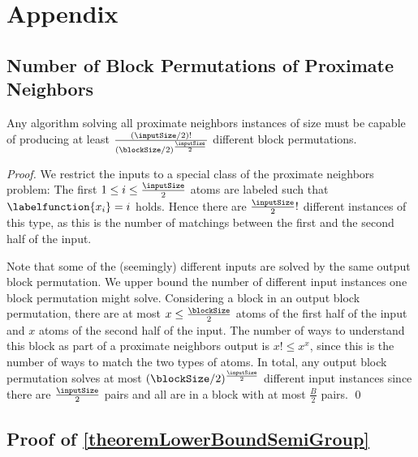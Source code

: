 \documentclass[envcountsame]{llncs}
\begin{document}
\newpage
\appendix

\section{Appendix}

\subsection{Number of Block Permutations of Proximate Neighbors}
\label{appendixProximateNeighbors}

\begin{lemma}
Any algorithm solving all proximate neighbors instances of size  must be capable of producing at least $\frac{(\inputSize/2)!}{(\blockSize/2)^{\frac{\inputSize}{2}}}$ different block permutations.
\end{lemma}

\begin{proof}


We restrict the inputs to a special class of the proximate neighbors problem:
The first $1\leq i\leq\frac{\inputSize}{2}$ atoms are labeled such that $\labelfunction{x_i}=i$ holds.
Hence there are $\frac{\inputSize}{2}!$ different instances of this type, as this is the number of matchings between the first and the second half of the input.

Note that some of the (seemingly) different inputs are solved by the same output block permutation.
We upper bound the number of different input instances one block permutation might solve.
Considering a block in an output block permutation, there are at most $x\leq\frac{\blockSize}{2}$ atoms of the first half of the input and $x$ atoms of the second half of the input.
The number of ways to understand this block as part of a proximate neighbors output is $x! \leq x^x$, since this is the number of ways to match the two types of atoms. In total, any output block permutation solves at most $(\blockSize/2)^{\frac{\inputSize}{2}}$ different input instances since there are $\frac{\inputSize}{2}$ pairs and all are in a block with at most $\frac{B}{2}$ pairs.
\qed
\end{proof}




\subsection{Proof of \autoref{theoremLowerBoundSemiGroup}}
\label{appendixSemigroup}
\end{document}
